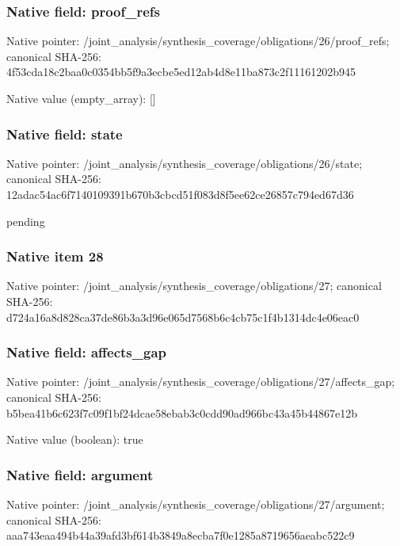\documentclass[10pt,a4paper]{article}
\begin{document}
\subsubsection{Native field: proof\_\allowbreak{}refs}
Native pointer: /joint\_\allowbreak{}analysis/synthesis\_\allowbreak{}coverage/obligations/26/proof\_\allowbreak{}refs; canonical SHA-256: 4f53cda18c2baa0c0354bb5f9a3ecbe5ed12ab4d8e11ba873c2f11161202b945

Native value (empty\_\allowbreak{}array): []

\subsubsection{Native field: state}
Native pointer: /joint\_\allowbreak{}analysis/synthesis\_\allowbreak{}coverage/obligations/26/state; canonical SHA-256: 12adac54ac6f7140109391b670b3cbcd51f083d8f5ee62ce26857c794ed67d36

\begingroup\raggedright\sloppy pending\par\endgroup

\subsubsection{Native item 28}
Native pointer: /joint\_\allowbreak{}analysis/synthesis\_\allowbreak{}coverage/obligations/27; canonical SHA-256: d724a16a8d828ca37de86b3a3d96e065d7568b6c4cb75c1f4b1314dc4e06eac0

\subsubsection{Native field: affects\_\allowbreak{}gap}
Native pointer: /joint\_\allowbreak{}analysis/synthesis\_\allowbreak{}coverage/obligations/27/affects\_\allowbreak{}gap; canonical SHA-256: b5bea41b6c623f7c09f1bf24dcae58ebab3c0cdd90ad966bc43a45b44867e12b

Native value (boolean): true

\subsubsection{Native field: argument}
Native pointer: /joint\_\allowbreak{}analysis/synthesis\_\allowbreak{}coverage/obligations/27/argument; canonical SHA-256: aaa743eaa494b44a39afd3bf614b3849a8ecba7f0e1285a8719656aeabc522c9
\end{document}
